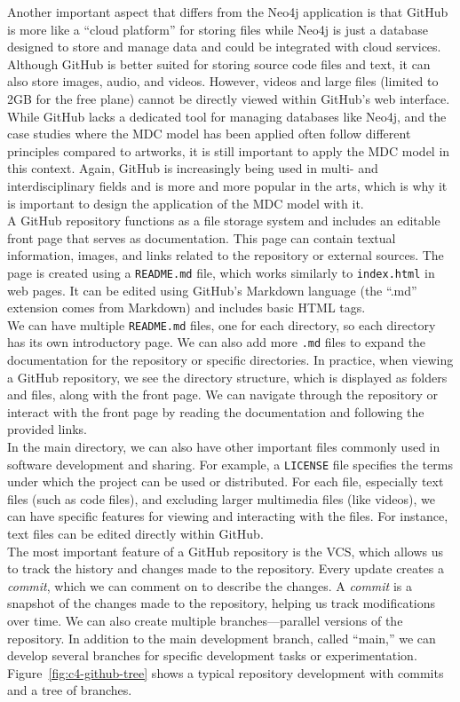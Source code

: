Another important aspect that differs from the Neo4j application is that GitHub is more like a ``cloud platform'' for storing files while Neo4j is just a database designed to store and manage data and could be integrated with cloud services. Although GitHub is better suited for storing source code files and text, it can also store images, audio, and videos. However, videos and large files (limited to 2GB for the free plane) cannot be directly viewed within GitHub’s web interface.\\
While GitHub lacks a dedicated tool for managing databases like Neo4j, and the case studies where the MDC model has been applied often follow different principles compared to artworks, it is still important to apply the MDC model in this context. Again, GitHub is increasingly being used in multi- and interdisciplinary fields and is more and more popular in the arts, which is why it is important to design the application of the MDC model with it.\\
\newline
A GitHub repository functions as a file storage system and includes an editable front page that serves as documentation. This page can contain textual information, images, and links related to the repository or external sources. The page is created using a \texttt{README.md} file, which works similarly to \texttt{index.html} in web pages. It can be edited using GitHub’s Markdown language (the ``.md'' extension comes from Markdown) and includes basic HTML tags.\\
We can have multiple \texttt{README.md} files, one for each directory, so each directory has its own introductory page. We can also add more \texttt{.md} files to expand the documentation for the repository or specific directories. In practice, when viewing a GitHub repository, we see the directory structure, which is displayed as folders and files, along with the front page. We can navigate through the repository or interact with the front page by reading the documentation and following the provided links.\\
In the main directory, we can also have other important files commonly used in software development and sharing. For example, a \texttt{LICENSE} file specifies the terms under which the project can be used or distributed. For each file, especially text files (such as code files), and excluding larger multimedia files (like videos), we can have specific features for viewing and interacting with the files. For instance, text files can be edited directly within GitHub.\\
The most important feature of a GitHub repository is the VCS, which allows us to track the history and changes made to the repository. Every update creates a \textit{commit}, which we can comment on to describe the changes. A \textit{commit} is a snapshot of the changes made to the repository, helping us track modifications over time. We can also create multiple branches—parallel versions of the repository. In addition to the main development branch, called ``main,'' we can develop several branches for specific development tasks or experimentation. Figure~\ref{fig:c4-github-tree} shows a typical repository development with commits and a tree of branches.

